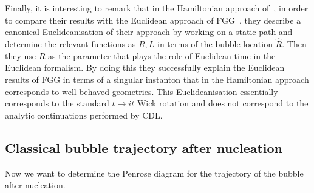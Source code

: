 \documentclass[a4paper,11pt]{article}
\numberwithin{equation}{section}
\begin{document}
Finally, it is interesting to remark that in the Hamiltonian approach of~\cite{Fischler:1989se,Fischler:1990pk}, in order to  compare their results with the Euclidean approach of FGG~\cite{Farhi:1989yr}, they describe a canonical Euclideanisation of their approach by working on a static path and determine the relevant functions as $R,L$ in terms of the bubble location $\hat R$. Then they use $\hat R$ as the parameter that plays the role of Euclidean time in the Euclidean formalism. By doing this they successfully explain the Euclidean results of FGG in terms of a singular instanton that in the Hamiltonian approach corresponds to well behaved geometries. This Euclideanisation essentially corresponds to the standard $t\rightarrow it$ Wick rotation and does not correspond to the analytic continuations performed by CDL.

\subsection{Classical bubble trajectory  after nucleation}
Now we want to determine the Penrose diagram for the trajectory of the bubble after nucleation.
\end{document}
